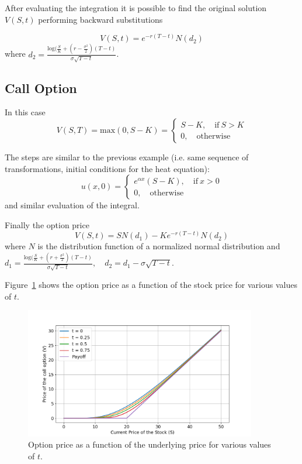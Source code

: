 After evaluating the integration it is possible to find the original solution $V(S,t)$ performing backward substitutions

\begin{equation}
V(S, t) = e^{-r(T-t)}N(d_2)
\end{equation}
where $d_2=\frac{\textrm{log}(\frac{S}{K}+\left(r-\frac{\sigma^2}{2}\right)(T-t)}{\sigma\sqrt{T-t}}$.

\subsection{Call Option}
In this case
\begin{equation}
V(S,T)=\textrm{max}(0,S-K)=
\begin{cases}
S-K,\quad \textrm{if}~S>K\\
0, \quad\textrm{otherwise}
\end{cases}
\end{equation}

The steps are similar to the previous example (i.e. same sequence of transformations, initial conditions for the heat equation):
\begin{equation}
u(x,0)=
\begin{cases}
e^{\alpha x}(S-K),\quad \textrm{if}~x>0\\
0, \quad\textrm{otherwise}
\end{cases}
\end{equation}
and similar evaluation of the integral.

Finally the option price
\begin{equation}
V(S,t) = SN(d_1)-Ke^{-r(T-t)}N(d_2)
\end{equation}
where $N$ is the distribution function of a normalized normal distribution and  $d_1=\frac{\textrm{log}(\frac{S}{K}+\left(r+\frac{\sigma^2}{2}\right)(T-t)}{\sigma\sqrt{T-t}},\quad d_2=d_1-\sigma\sqrt{T-t}$.

Figure~\ref{fig:call_option} shows the option price as a function of the stock price for various values of $t$.

\begin{figure}[htb]
  \centering
  \includegraphics[width=0.9\textwidth]{figures/call_option_price}
  \caption{Option price as a function of the underlying price for various values of $t$.}
  \label{fig:call_option}
\end{figure}


